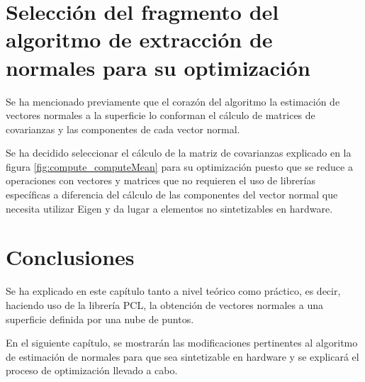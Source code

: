 
\section{Selección del fragmento del algoritmo de extracción de normales para su optimización}
Se ha mencionado previamente que el corazón del algoritmo la estimación de vectores normales a la superficie lo conforman el cálculo de matrices de covarianzas y las componentes de cada vector normal.

Se ha decidido seleccionar el cálculo de la matriz de covarianzas explicado en la figura \ref{fig:compute_computeMean} para su optimización puesto que se reduce a operaciones con vectores y matrices que no requieren el uso de librerías específicas a diferencia del cálculo de las componentes del vector normal que necesita utilizar Eigen y da lugar a elementos no sintetizables en hardware. 

\section{Conclusiones}

Se ha explicado en este capítulo tanto a nivel teórico como práctico, es decir, haciendo uso de la librería PCL, la obtención de vectores normales a una superficie definida por una nube de puntos.

En el siguiente capítulo, se mostrarán las modificaciones pertinentes al algoritmo de estimación de normales para que sea sintetizable en hardware y se explicará el proceso de optimización llevado a cabo.
